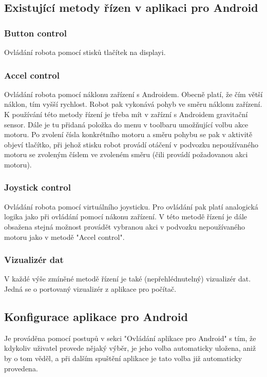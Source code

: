 \documentclass[12pt, ngerman]{article}
\begin{document}
\subsection{Existující metody řízen v aplikaci pro Android}
\subsubsection{Button control}
Ovládání robota pomocí stisků tlačítek na displayi.
\subsubsection{Accel control}
Ovládání robota pomocí náklonu zařízení s Androidem. Obecně platí, že čím větší náklon, tím vyšší rychlost. Robot pak vykonává pohyb ve směru náklonu zařízení. K používání této metody řízení je třeba mít v zařízní s Androidem gravitační sensor. Dále je tu přidaná položka do menu v toolbaru umožňující volbu akce motoru. Po zvolení čísla konkrétního motoru a směru pohybu se pak v aktivitě objeví tlačítko, při jehož stisku robot provádí otáčení v podvozku nepoužívaného motoru se zvoleným číslem ve zvoleném směru (čili provádí požadovanou akci motoru).
\subsubsection{Joystick control}
Ovládání robota pomocí virtuálního joysticku. Pro ovládání pak platí analogická logika jako při ovládání pomocí nákonu zařízení. V této metodě řízení je dále obsažena stejná možnost provádět vybranou akci v podvozku nepoužívaného motoru jako v metodě "Accel control".
\subsubsection{Vizualizér dat}
V každé výše zmíněné metodě řízení je také (nepřehlédnutelný) vizualizér dat. Jedná se o portovaný vizualizér z aplikace pro počítač.

\subsection{Konfigurace aplikace pro Android}
Je prováděna pomocí postupů v sekci "Ovládání aplikace pro Android" s tím, že kdykoliv uživatel provede nějaký výběr, je jeho volba automaticky uložena, aniž by o tom věděl, a při dalším spuštění aplikace je tato volba již automaticky provedena.
\end{document}
